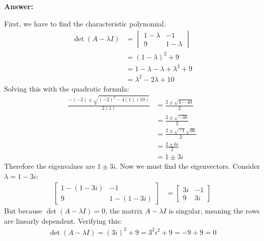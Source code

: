 \documentclass[10pt,letterpaper,final]{report}
\begin{document}
\medskip
\noindent\textbf{Answer:}

First, we have to find the characteristic polynomial.
\begin{align*}
  \det(A - \lambda I) & = \begin{vmatrix}
                            1 - \lambda & -1          \\
                            9           & 1 - \lambda
                          \end{vmatrix}           \\[1ex]
                      & = (1 - \lambda)^2 + 9                   \\[1ex]
                      & = 1 - \lambda - \lambda + \lambda^2 + 9 \\[1ex]
                      & = \lambda^2 - 2\lambda + 10
\end{align*}
Solving this with the quadratic formula:
\begin{align*}
  \frac{-(-2) \pm \sqrt{(-2)^2 - 4(1)(10)}}{2(1)} & = \frac{2 \pm \sqrt{4 - 40}}{2}      \\[1ex]
                                                  & = \frac{2 \pm \sqrt{-36}}{2}         \\[1ex]
                                                  & = \frac{2 \pm \sqrt{-1}\sqrt{36}}{2} \\[1ex]
                                                  & = \frac{2 \pm 6i}{2}                 \\[1ex]
                                                  & = 1 \pm 3i
\end{align*}
Therefore the eigenvalues are $1 \pm 3i$. Now we must find the eigenvectors. Consider $\lambda = 1 - 3i$:
\begin{align*}
  \begin{bmatrix}
    1 - (1 - 3i) & -1           \\
    9            & 1 - (1 - 3i)
  \end{bmatrix} & = \begin{bmatrix}
                      3i & -1 \\
                      9  & 3i
                    \end{bmatrix}
\end{align*}
But because $\det(A - \lambda I) = 0$, the matrix $A - \lambda I$ is singular, meaning the rows are linearly dependent. Verifying this:
\begin{align*}
  \det(A - \lambda I) = (3i)^2 + 9 = 3^2i^2 + 9 = -9 + 9 = 0
\end{align*}
\end{document}
